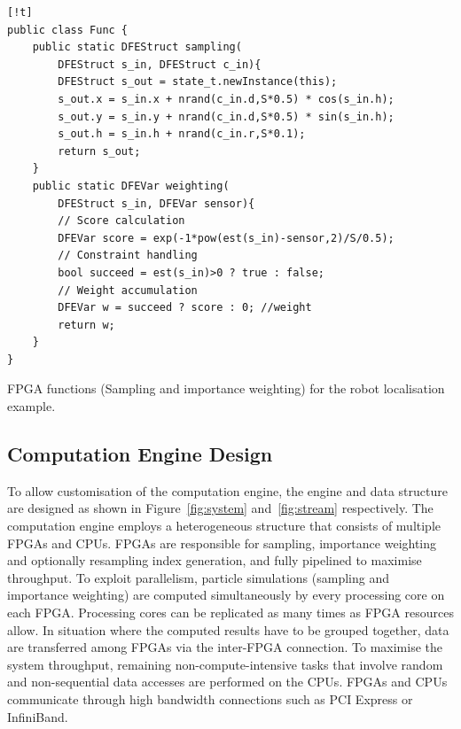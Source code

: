 \begin{Code}
\centering
\lstset{language=Java,
        basicstyle=\ttfamily\small,
				tabsize=2,
				numbers=left,
				numberstyle=\tiny,
				frame=tb,
				columns=fullflexible,
				showstringspaces=false
				}
\begin{lstlisting}[][!t]
public class Func {
	public static DFEStruct sampling(
		DFEStruct s_in, DFEStruct c_in){
		DFEStruct s_out = state_t.newInstance(this);
		s_out.x = s_in.x + nrand(c_in.d,S*0.5) * cos(s_in.h);
		s_out.y = s_in.y + nrand(c_in.d,S*0.5) * sin(s_in.h);
		s_out.h = s_in.h + nrand(c_in.r,S*0.1);
		return s_out;
	}
	public static DFEVar weighting(
		DFEStruct s_in, DFEVar sensor){
		// Score calculation
		DFEVar score = exp(-1*pow(est(s_in)-sensor,2)/S/0.5);
		// Constraint handling
		bool succeed = est(s_in)>0 ? true : false;
		// Weight accumulation
		DFEVar w = succeed ? score : 0; //weight
		return w;
	}
}
\end{lstlisting}
\caption{\small FPGA functions (Sampling and importance weighting) for the robot localisation example.}
\label{lst:func}
\end{Code}


\subsection{Computation Engine Design}
\label{sec:system}

To allow customisation of the computation engine, the engine and data structure are designed as shown in Figure~\ref{fig:system} and~\ref{fig:stream} respectively.
The computation engine employs a heterogeneous structure that consists of multiple FPGAs and CPUs.
FPGAs are responsible for sampling, importance weighting and optionally resampling index generation, and fully pipelined to maximise throughput. 
To exploit parallelism, particle simulations (sampling and importance weighting) are computed simultaneously by every processing core on each FPGA. 
Processing cores can be replicated as many times as FPGA resources allow.
In situation where the computed results have to be grouped together, data are transferred among FPGAs via the inter-FPGA connection.
To maximise the system throughput, remaining non-compute-intensive tasks that involve random and non-sequential data accesses are performed on the CPUs.
FPGAs and CPUs communicate through high bandwidth connections such as PCI Express or InfiniBand.

